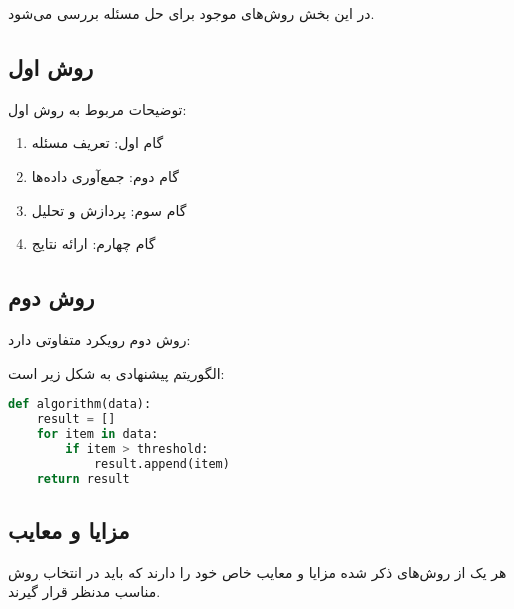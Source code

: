 در این بخش روش‌های موجود برای حل مسئله بررسی می‌شود.

\subsection{روش اول}
توضیحات مربوط به روش اول:

\begin{enumerate}
    \item گام اول: تعریف مسئله
    \item گام دوم: جمع‌آوری داده‌ها
    \item گام سوم: پردازش و تحلیل
    \item گام چهارم: ارائه نتایج
\end{enumerate}

\subsection{روش دوم}
روش دوم رویکرد متفاوتی دارد:

الگوریتم پیشنهادی به شکل زیر است:

\begin{latin}
\begin{lstlisting}[language=Python, caption=نمونه کد الگوریتم]
def algorithm(data):
    result = []
    for item in data:
        if item > threshold:
            result.append(item)
    return result
\end{lstlisting}
\end{latin}

\subsection{مزایا و معایب}
هر یک از روش‌های ذکر شده مزایا و معایب خاص خود را دارند که باید در انتخاب روش مناسب مدنظر قرار گیرند.

